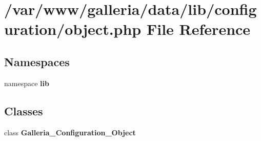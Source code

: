 \section{/var/www/galleria/data/lib/configuration/object.php File Reference}
\label{configuration_2object_8php}
\subsection*{Namespaces}
\begin{CompactItemize}
\item 
namespace {\bf lib}
\end{CompactItemize}
\subsection*{Classes}
\begin{CompactItemize}
\item 
class {\bf Galleria\_\-Configuration\_\-Object}
\end{CompactItemize}
